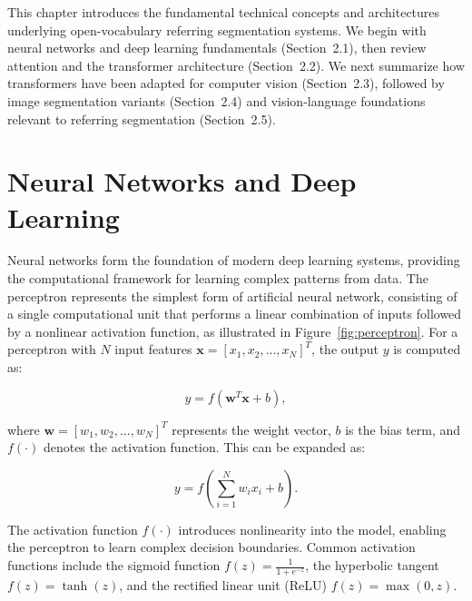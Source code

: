 \cleardoublepage
\label{chap:back}

This chapter introduces the fundamental technical concepts and architectures underlying open-vocabulary referring segmentation systems. We begin with neural networks and deep learning fundamentals (Section~2.1), then review attention and the transformer architecture (Section~2.2). We next summarize how transformers have been adapted for computer vision (Section~2.3), followed by image segmentation variants (Section~2.4) and vision-language foundations relevant to referring segmentation (Section~2.5).

\section{Neural Networks and Deep Learning}

Neural networks form the foundation of modern deep learning systems, providing the computational framework for learning complex patterns from data. The perceptron represents the simplest form of artificial neural network, consisting of a single computational unit that performs a linear combination of inputs followed by a nonlinear activation function, as illustrated in Figure~\ref{fig:perceptron}. For a perceptron with $N$ input features $\mathbf{x} = [x_1, x_2, \ldots, x_N]^T$, the output $y$ is computed as:

\begin{equation}
y = f(\mathbf{w}^T\mathbf{x} + b),
\end{equation}

where $\mathbf{w} = [w_1, w_2, \ldots, w_N]^T$ represents the weight vector, $b$ is the bias term, and $f(\cdot)$ denotes the activation function. This can be expanded as:

\begin{equation}
y = f\left(\sum_{i=1}^{N} w_i x_i + b\right).
\end{equation}

The activation function $f(\cdot)$ introduces nonlinearity into the model, enabling the perceptron to learn complex decision boundaries. Common activation functions include the sigmoid function $f(z) = \frac{1}{1 + e^{-z}}$, the hyperbolic tangent $f(z) = \tanh(z)$, and the rectified linear unit (ReLU) $f(z) = \max(0, z)$.

